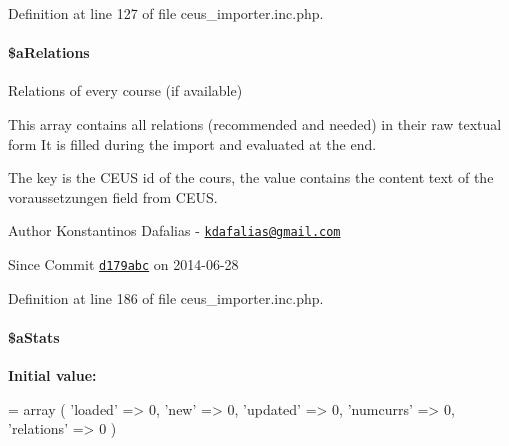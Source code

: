Definition at line 127 of file ceus\+\_\+importer.\+inc.\+php.

\hypertarget{classceus__importer_a112b3b5ddcf754007f9466ec5ab94683}{
\paragraph[{\$a\+Relations}]{\setlength{\rightskip}{0pt plus 5cm}\$a\+Relations\hspace{0.3cm}{\ttfamily [private]}}}\label{classceus__importer_a112b3b5ddcf754007f9466ec5ab94683}


Relations of every course (if available) 

This array contains all relations (recommended and needed) in their raw textual form It is filled during the import and evaluated at the end.

The key is the C\+E\+U\+S id of the cours, the value contains the content text of the {\ttfamily voraussetzungen} field from C\+E\+U\+S.

\begin{DoxyAuthor}{Author}
Konstantinos Dafalias -\/ \href{mailto:kdafalias@gmail.com}{\tt kdafalias@gmail.\+com} 
\end{DoxyAuthor}
\begin{DoxySince}{Since}
Commit \href{http://github.com/TheJake123/DrupalModul/commit/d179abcc5e05743086cd67cf1ce30b08923a7183}{\tt d179abc} on 2014-\/06-\/28 
\end{DoxySince}


Definition at line 186 of file ceus\+\_\+importer.\+inc.\+php.

\hypertarget{classceus__importer_ac383d13daab8093b15c3925f305d8c08}{
\paragraph[{\$a\+Stats}]{\setlength{\rightskip}{0pt plus 5cm}\$a\+Stats\hspace{0.3cm}{\ttfamily [private]}}}\label{classceus__importer_ac383d13daab8093b15c3925f305d8c08}
{\bfseries Initial value\+:}
\begin{DoxyCode}
= array (
            \textcolor{stringliteral}{'loaded'} => 0,
            \textcolor{stringliteral}{'new'} => 0,
            \textcolor{stringliteral}{'updated'} => 0,
            \textcolor{stringliteral}{'numcurrs'} => 0,
            \textcolor{stringliteral}{'relations'} => 0 
    )
\end{DoxyCode}


